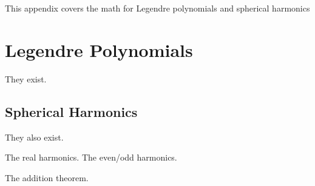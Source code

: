 


This appendix covers the math for Legendre polynomials and spherical harmonics

\section{Legendre Polynomials}

They exist.

\subsection{Spherical Harmonics}

They also exist.

The real harmonics. The even/odd harmonics.

The addition theorem.

\endinput

